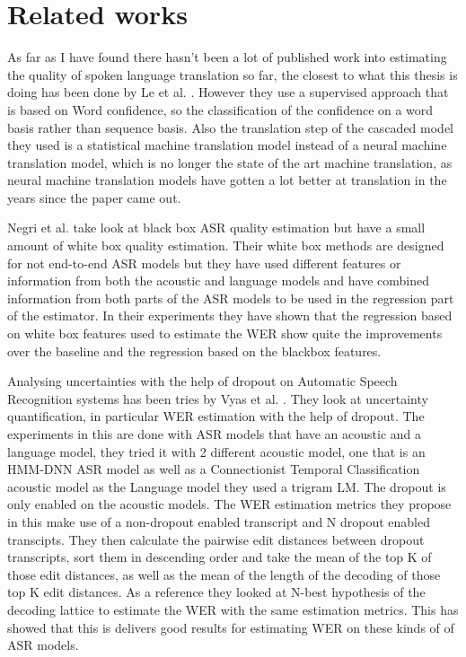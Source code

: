 
\chapter{Related works}
\label{ch:relatecworks}
As far as I have found there hasn't been a lot of published work into estimating the quality of spoken language translation so far, the closest to what this thesis is doing has been done by Le et al. \cite{le2016automatic}. 
However they use a supervised approach that is based on Word confidence, so the classification of the confidence on a word basis rather than sequence basis. Also the translation step of the cascaded model they used is a statistical machine translation model instead of a neural machine translation model, which is no longer the state of the art machine translation, as neural machine translation models have gotten a lot better at translation in the years since the paper came out. 

Negri et al.\cite{negri-etal-2014-quality} take look at black box ASR quality estimation but have a small amount of white box quality estimation. Their white box methods are designed for not end-to-end ASR models but they have used different features or information from both the acoustic and language models and have combined information from both parts of the ASR models to be used in the regression part of the estimator. In their experiments they have shown that the regression based on white box features used to estimate the WER show quite the improvements over the baseline and the regression based on the blackbox features. 

Analysing uncertainties with the help of dropout on Automatic Speech Recognition systems has been tries by Vyas et al. \cite{8683086}. They look at uncertainty quantification, in particular WER estimation with the help of dropout. The experiments in this are done with ASR models that have an acoustic and a language model, they tried it with 2 different acoustic model, one that is an HMM-DNN ASR model as well as a Connectionist Temporal Classification acoustic model as the Language model they used a trigram LM. The dropout is only enabled on the acoustic models. 
The WER estimation metrics they propose in this make use of a non-dropout enabled transcript and N dropout enabled transcipts. They then calculate the pairwise edit distances between dropout transcripts, sort them in descending order and take the mean of the top K of those edit distances, as well as the mean of the length of the decoding of those top K edit distances. As a reference they looked at N-best hypothesis of the decoding lattice to estimate the WER with the same estimation metrics. This has showed that this is delivers good results for estimating WER on these kinds of of ASR models. 


